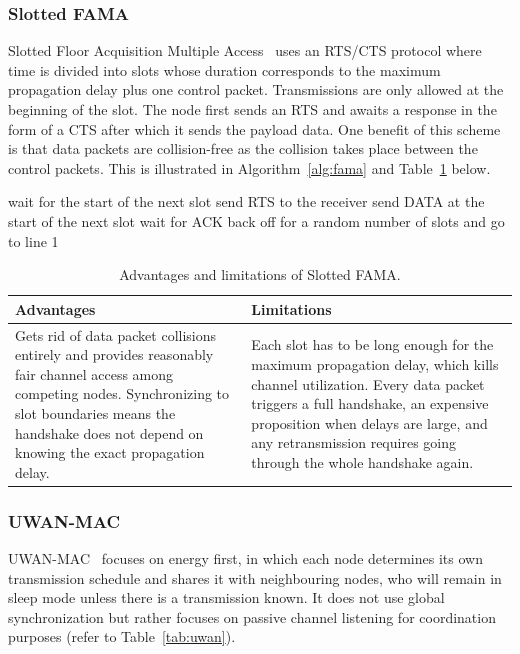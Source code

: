 \documentclass{article}
\newcommand{\advlim}[3]{%
\begin{table}[H]
\centering
\caption{#1}
\small
\setstretch{1.2}
\renewcommand{\arraystretch}{1.3}
\setlength{\tabcolsep}{8pt}
\begin{tabular}{|>{\raggedright\arraybackslash}p{0.42\textwidth}|>{\raggedright\arraybackslash}p{0.42\textwidth}|}
\hline
\textbf{Advantages} & \textbf{Limitations} \\
\hline
\rule{0pt}{3.2ex}#2\vspace{5pt} & \rule{0pt}{3.2ex}#3\vspace{5pt} \\
\hline
\end{tabular}
\end{table}}
\begin{document}
\subsubsection{Slotted FAMA}
Slotted Floor Acquisition Multiple Access~\cite{slottedfama2006} uses an RTS/CTS protocol where time is divided into slots whose duration corresponds to the maximum propagation delay plus one control packet. Transmissions are only allowed at the beginning of the slot. The node first sends an RTS and awaits a response in the form of a CTS after which it sends the payload data. One benefit of this scheme is that data packets are collision-free as the collision takes place between the control packets. This is illustrated in Algorithm~\ref{alg:fama} and Table~\ref{tab:fama} below.

\begin{algorithm}[H]
\caption{Slotted FAMA (sender side)}
\label{alg:fama}
\begin{algorithmic}[1]
\STATE wait for the start of the next slot
\STATE send RTS to the receiver
    \STATE send DATA at the start of the next slot
    \STATE wait for ACK
\ELSE
    \STATE back off for a random number of slots and go to line 1
\ENDIF
\end{algorithmic}
\end{algorithm}

\advlim{Advantages and limitations of Slotted FAMA.\label{tab:fama}}
{Gets rid of data packet collisions entirely and provides reasonably fair channel access among competing nodes. Synchronizing to slot boundaries means the handshake does not depend on knowing the exact propagation delay.}
{Each slot has to be long enough for the maximum propagation delay, which kills channel utilization. Every data packet triggers a full handshake, an expensive proposition when delays are large, and any retransmission requires going through the whole handshake again.}

\subsubsection{UWAN-MAC}
UWAN-MAC~\cite{uwmac2007} focuses on energy first, in which each node determines its own transmission schedule and shares it with neighbouring nodes, who will remain in sleep mode unless there is a transmission known. It does not use global synchronization but rather focuses on passive channel listening for coordination purposes (refer to Table~\ref{tab:uwan}).
\end{document}
